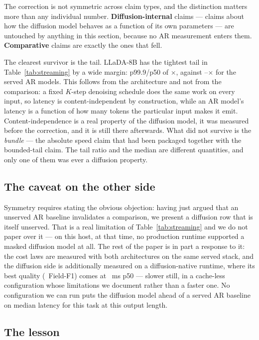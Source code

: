 The correction is not symmetric across claim types, and the distinction matters
more than any individual number. \textbf{Diffusion-internal} claims --- claims
about how the diffusion model behaves as a function of its own parameters ---
are untouched by anything in this section, because no AR measurement enters
them. \textbf{Comparative} claims are exactly the ones that fell.

The clearest survivor is the tail. LLaDA-8B has the tightest tail in
Table~\ref{tab:streaming} by a wide margin: p99.9/p50 of
\mdmTailRatio$\times$, against \arTailRatioLo--\arTailRatioHi$\times$ for the
served AR models. This follows from the architecture and not from the
comparison: a fixed $K$-step denoising schedule does the same work on every
input, so latency is content-independent by construction, while an AR model's
latency is a function of how many tokens the particular input makes it emit.
Content-independence is a real property of the diffusion model, it was measured
before the correction, and it is still there afterwards. What did not survive is
the \emph{bundle} --- the absolute speed claim that had been packaged together
with the bounded-tail claim. The tail ratio and the median are different
quantities, and only one of them was ever a diffusion property.

\subsection{The caveat on the other side}
\label{sec:mdm-caveat}

Symmetry requires stating the obvious objection: having just argued that an
unserved AR baseline invalidates a comparison, we present a diffusion row that
is itself unserved. That is a real limitation of Table~\ref{tab:streaming} and
we do not paper over it --- on this host, at that time, no production runtime
supported a masked diffusion model at all. The rest of the paper is in part a
response to it: the cost laws are measured with both architectures on the same
served stack, and the diffusion side is additionally measured on a
diffusion-native runtime, where its best quality (\dinferFOne\ Field-F1) comes
at \dinferPFifty~ms p50 --- slower still, in a cache-less configuration whose
limitations we document rather than a faster one. No configuration we can run
puts the diffusion model ahead of a served AR baseline on median latency for
this task at this output length.

\subsection{The lesson}

